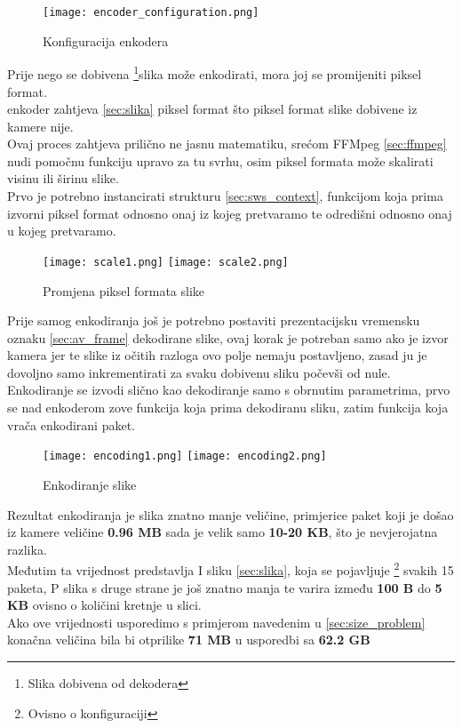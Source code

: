 \begin{figure}[h]
  \texttt{[image: encoder\_configuration.png]}
  \caption{Konfiguracija enkodera}
\end{figure}
\noindent
Prije nego se dobivena \footnote{Slika dobivena od dekodera}{slika} može enkodirati, mora joj se promijeniti piksel format. \\
 enkoder zahtjeva  \ref{sec:slika} piksel format što piksel format slike dobivene iz 
kamere nije. \\
Ovaj proces zahtjeva prilično ne jasnu matematiku, srećom FFMpeg \ref{sec:ffmpeg} nudi pomočnu
funkciju  upravo za tu svrhu, osim piksel formata može skalirati visinu ili širinu slike. \\
Prvo je potrebno instancirati strukturu  \ref{sec:sws_context}, funkcijom 
koja prima izvorni piksel format odnosno onaj iz kojeg pretvaramo te odredišni odnosno onaj u kojeg pretvaramo.

\begin{figure}[h]
  \texttt{[image: scale1.png]}
  \texttt{[image: scale2.png]}
  \caption{Promjena piksel formata slike}
\end{figure}
\noindent
Prije samog enkodiranja još je potrebno postaviti prezentacijsku vremensku oznaku \ref{sec:av_frame} dekodirane slike,
ovaj korak je potreban samo ako je izvor kamera jer te slike iz očitih razloga ovo polje nemaju postavljeno, zasad ju je
dovoljno samo inkrementirati za svaku dobivenu sliku počevši od nule.
\paraBreak
Enkodiranje se izvodi slično kao dekodiranje samo s obrnutim parametrima, prvo se nad enkoderom zove funkcija
 koja prima dekodiranu sliku, zatim funkcija  koja 
vrača enkodirani paket.

\begin{figure}[h]
  \texttt{[image: encoding1.png]}
  \texttt{[image: encoding2.png]}
  \caption{Enkodiranje slike}
\end{figure}
\noindent
Rezultat enkodiranja je slika znatno manje veličine, primjerice paket koji je došao iz kamere veličine 
\textbf{0.96 MB} sada je velik samo \textbf{10-20 KB}, što je nevjerojatna razlika.\\
Međutim ta vrijednost predstavlja I sliku \ref{sec:slika}, koja se pojavljuje \footnote{Ovisno o konfiguraciji} svakih 15
paketa, P slika s druge strane je još znatno manja te varira između \textbf{100 B} do \textbf{5 KB} ovisno o količini
kretnje u slici. \\
Ako ove vrijednosti usporedimo s primjerom navedenim u \ref{sec:size_problem} konačna veličina bila bi otprilike 
\textbf{71 MB} u usporedbi sa \textbf{62.2 GB}

